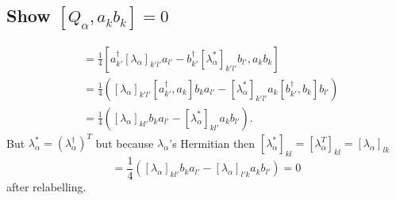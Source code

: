 \documentclass[main.tex]{subfiles}
\begin{document}
\subsection{Show $[Q_{\alpha},a_kb_k]=0$}
\begin{align}
[Q_{\alpha},a_kb_k]&=\frac{1}{4}\left[ a^{\dagger}_{k'}[\lambda_{\alpha}]_{k'l'}a_{l'}-b^{\dagger}_{k'}[\lambda^*_{\alpha}]_{k'l'}b_{l'} ,a_kb_k \right]\\
&=\frac{1}{4}\left([\lambda_{\alpha}]_{k'l'} [a^{\dagger}_{k'},a_k]b_ka_{l'} -[\lambda^*_{\alpha}]_{k'l'}a_k[b^{\dagger}_{k'},b_k]b_{l'}         \right)\\
&=\frac{1}{4}\left([\lambda_{\alpha}]_{kl'}b_ka_{l'} -[\lambda^*_{\alpha}]_{kl'}a_kb_{l'}         \right).
\end{align}
But $\lambda^*_{\alpha}=(\lambda^{\dagger}_{\alpha})^T$ but because $\lambda_{\alpha}$'s Hermitian then $[\lambda^*_{\alpha}]_{kl}=[\lambda_{\alpha}^T]_{kl}=[\lambda_{\alpha}]_{lk}$
\begin{equation}
[Q_{\alpha},a_kb_k]=\frac{1}{4}\left([\lambda_{\alpha}]_{kl'}b_ka_{l'} -[\lambda_{\alpha}]_{l'k}a_kb_{l'}         \right)=0
\end{equation}
after relabelling.
\end{document}
